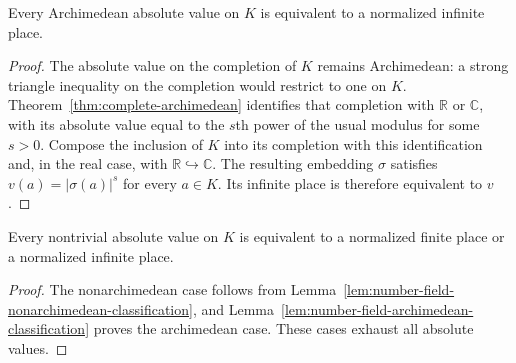 \begin{lemma}\label{lem:number-field-archimedean-classification}
\leanok
{}
Every Archimedean absolute value on $K$ is equivalent to a normalized
infinite place.
\end{lemma}
\begin{proof}
The absolute value on the completion of $K$ remains Archimedean: a strong
triangle inequality on the completion would restrict to one on $K$.
Theorem~\ref{thm:complete-archimedean} identifies that completion with
$\mathbb R$ or $\mathbb C$, with its absolute value equal to the $s$th
power of the usual modulus for some $s>0$. Compose the inclusion of $K$
into its completion with this identification and, in the real case, with
$\mathbb R\hookrightarrow\mathbb C$. The resulting embedding $\sigma$
satisfies $v(a)=|\sigma(a)|^s$ for every $a\in K$. Its infinite place is
therefore equivalent to $v$.
\end{proof}

\begin{theorem}\label{thm:number-field-ostrowski}
\leanok
{}
Every nontrivial absolute value on $K$ is equivalent to a normalized
finite place or a normalized infinite place.
\end{theorem}
\begin{proof}
The nonarchimedean case follows from
Lemma~\ref{lem:number-field-nonarchimedean-classification}, and
Lemma~\ref{lem:number-field-archimedean-classification} proves the
archimedean case. These cases exhaust all absolute values.
\end{proof}

